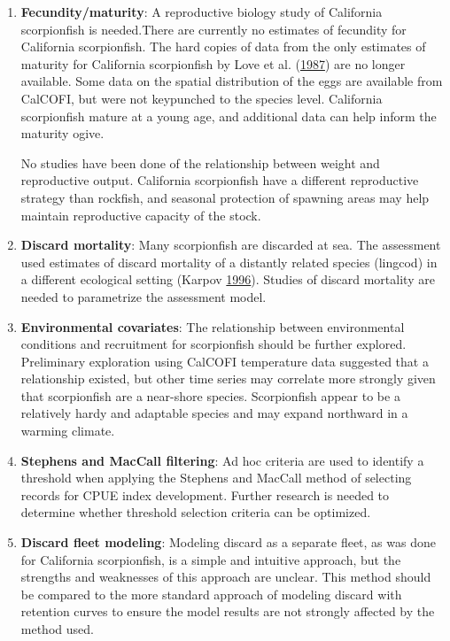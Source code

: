 \documentclass[12pt,]{article}
\begin{document}
\begin{enumerate}
\item \textbf{Fecundity/maturity}: A reproductive biology study of California 
scorpionfish is needed.There are currently no estimates of fecundity 
for California scorpionfish.  The hard copies of data from the only
estimates of maturity for California scorpionfish by Love et al. 
(\protect\hyperlink{ref-Love1987}{1987}) are no longer available.  
Some data on the spatial distribution of the 
eggs are available from CalCOFI, but were not keypunched to the species level. 
California scorpionfish mature at a young age, and additional data can help 
inform the maturity ogive.

No studies have been done of the relationship between weight and reproductive 
output.  California scorpionfish have a different reproductive strategy than rockfish, 
and seasonal protection of spawning areas may help maintain reproductive capacity 
of the stock.

\item \textbf{Discard mortality}: Many scorpionfish are discarded at sea. The assessment 
used estimates of discard mortality of a distantly related species (lingcod) 
in a different ecological setting (Karpov \protect\hyperlink{ref-Karpov1996}{1996}). 
Studies of discard mortality are needed 
to parametrize the assessment model.

\item \textbf{Environmental covariates}: The relationship between environmental 
conditions and recruitment for scorpionfish should be further explored. Preliminary 
exploration using CalCOFI temperature data suggested that a relationship existed, 
but other time series may correlate more strongly given that scorpionfish are a 
near-shore species.  Scorpionfish appear to be a relatively hardy and adaptable 
species and may expand northward in a warming climate.  


\item \textbf{Stephens and MacCall filtering}: Ad hoc criteria are used to identify 
a threshold when applying the Stephens and MacCall method of selecting records for 
CPUE index development.  Further research is needed to determine whether threshold 
selection criteria can be optimized.


\item \textbf{Discard fleet modeling}: Modeling discard as a separate fleet, as 
was done for California scorpionfish, is a simple and intuitive approach, but 
the strengths and weaknesses of this approach are unclear. This method should 
be compared to the more standard approach of modeling discard with retention 
curves to ensure the model results are not strongly affected by the method used.



\end{enumerate}
\end{document}
